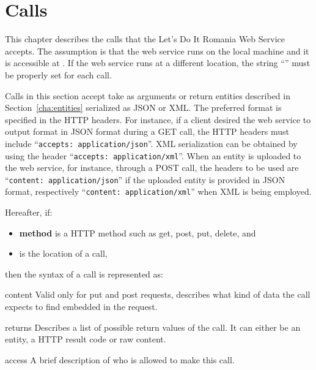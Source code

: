\chapter{Calls}
\label{cha:calls}

This chapter describes the calls that the Let's Do It Romania Web Service
accepts. The assumption is that the web service runs on the local machine and it
is accessible at \baselocation. If the web service runs at a different location,
the string ``\baselocation'' must be properly set for each call.

Calls in this section accept take as arguments or return entities described in
Section~\ref{cha:entities} serialized as JSON or XML. The preferred format is
specified in the HTTP headers. For instance, if a client desired the web service
to output format in JSON format during a GET call, the HTTP headers must include
``\texttt{accepts: application/json}''. XML serialization can be obtained by
using the header ``\texttt{accepts: application/xml}''. When an entity is
uploaded to the web service, for instance, through a POST call, the headers to
be used are ``\texttt{content: application/json}'' if the uploaded entity is
provided in JSON format, respectively ``\texttt{content: application/xml}'' when
XML is being employed.

Hereafter, if:
\begin{itemize}
  \item {\sffamily \bfseries method} is a HTTP method such as get, post, put,
    delete, and
  \item \texttt{} is the location of a call,
\end{itemize}
then the syntax of a call is represented as:

\bigskip

\begin{apidata}{content}
  Valid only for put and post requests, describes what kind of data the call
  expects to find embedded in the request.
\end{apidata}
\begin{apidata}{returns}
  Describes a list of possible return values of the call. It can either be an
  entity, a HTTP result code or raw content.
\end{apidata}
\begin{apidata}{access}
  A brief description of who is allowed to make this call.
\end{apidata}









